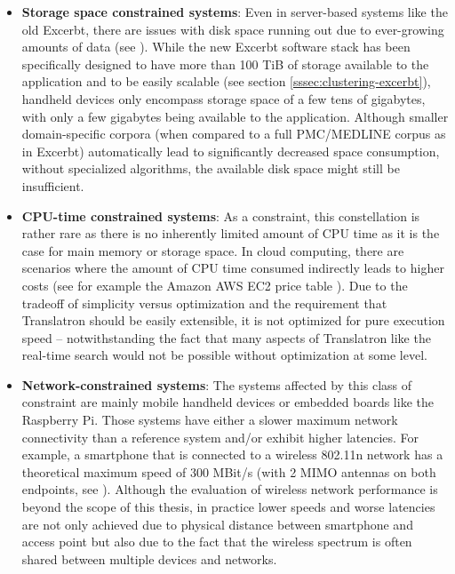 \documentclass[a4paper, 12pt, twoside, reqn]{report}
\numberwithin{figure}{chapter}
\newtheorem[L]{boxedDefinition}{Definition}
\newtheorem[L]{boxedExample}{Example}
\begin{document}
\begin{itemize}
  \item \textbf{Storage space constrained systems}: Even in server-based systems like the old Excerbt, there are issues with disk space running out due to ever-growing amounts of data (see \cite[section 4.2.1]{wachinger2013next}). While the new Excerbt software stack has been specifically designed to have more than 100 TiB of storage available to the application and to be easily scalable (see section \ref{sssec:clustering-excerbt}), handheld devices only encompass storage space of a few tens of gigabytes, with only a few gigabytes being available to the application. Although smaller domain-specific corpora (when compared to a full PMC/MEDLINE corpus as in Excerbt) automatically lead to significantly decreased space consumption, without specialized algorithms, the available disk space might still be insufficient.
  
  \item \textbf{CPU-time constrained systems}: As a constraint, this constellation is rather rare as there is no inherently limited amount of CPU time as it is the case for main memory or storage space. In cloud computing, there are scenarios where the amount of CPU time consumed indirectly leads to higher costs (see for example the Amazon AWS EC2 price table \cite{ec2-pricing}). Due to the tradeoff of simplicity versus optimization and the requirement that Translatron should be easily extensible, it is not optimized for pure execution speed -- notwithstanding the fact that many aspects of Translatron like the real-time search would not be possible without optimization at some level.
  
  \item \textbf{Network-constrained systems}: The systems affected by this class of constraint are mainly mobile handheld devices or embedded boards like the Raspberry Pi. Those systems have either a slower maximum network connectivity than a reference system and/or exhibit higher latencies. For example, a smartphone that is connected to a wireless 802.11n network has a theoretical maximum speed of 300 MBit/s (with 2 MIMO antennas on both endpoints, see \cite{ieee80211n}). Although the evaluation of wireless network performance is beyond the scope of this thesis, in practice lower speeds and worse latencies are not only achieved due to physical distance between smartphone and access point but also due to the fact that the wireless spectrum is often shared between multiple devices and networks.
  

\end{itemize}
\end{document}
